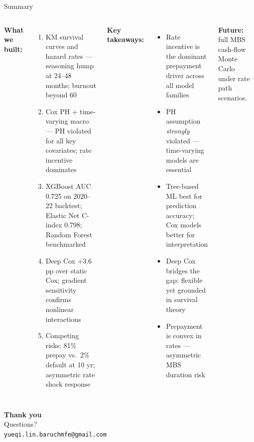 \documentclass[aspectratio=169]{beamer}
\begin{document}
\begin{frame}{Summary}
  \begin{columns}
      \textbf{What we built:}
      \begin{enumerate}
        \item[\textbf{A}] KM survival curves and hazard rates —
          seasoning hump at 24–48 months; burnout beyond 60
        \item[\textbf{B}] Cox PH + time-varying macro — PH violated
          for all key covariates; rate incentive dominates
        \item[\textbf{C}] XGBoost AUC 0.725 on 2020–22 backtest;
          Elastic Net C-index 0.798; Random Forest benchmarked
        \item[\textbf{D}] Deep Cox +3.6 pp over static Cox;
          gradient sensitivity confirms nonlinear interactions
        \item[\textbf{E}] Competing risks: 81\% prepay vs.\ 2\% default
          at 10 yr; asymmetric rate shock response
      \end{enumerate}
      \textbf{Key takeaways:}
      \begin{itemize}
        \item \alert{Rate incentive} is the dominant prepayment driver
          across all model families
        \item PH assumption \emph{strongly} violated —
          time-varying models are essential
        \item Tree-based ML best for prediction accuracy;
          Cox models better for interpretation
        \item Deep Cox bridges the gap: flexible yet
          grounded in survival theory
        \item Prepayment is \alert{convex} in rates —
          asymmetric MBS duration risk
      \end{itemize}
      \vspace{0.3em}
      \textbf{Future:} full MBS cash-flow Monte Carlo under
      rate path scenarios.
  \end{columns}
\end{frame}

\begin{frame}[plain]
  \begin{center}
    \Large\textbf{Thank you}\\[1em]
    \normalsize Questions?\\[2em]
    \small\texttt{yueqi.lin.baruchmfe@gmail.com}
  \end{center}
\end{frame}
\end{document}
